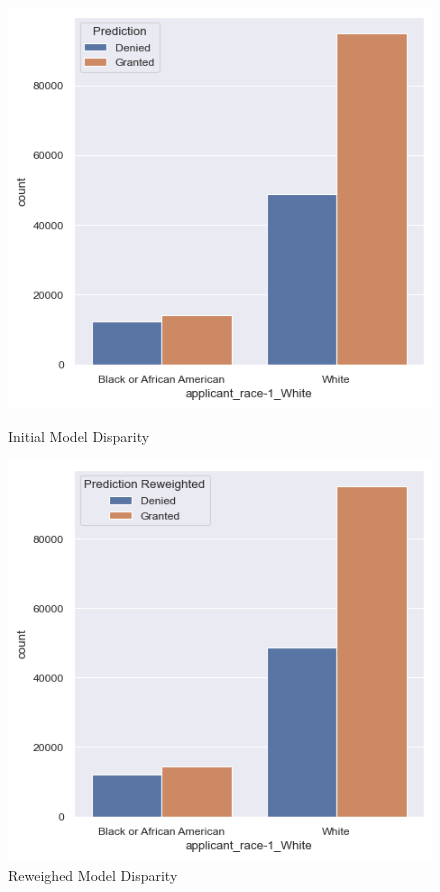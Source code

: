 \begin{figure}[h]
    \centering
    \begin{minipage}{0.5\textwidth}
        \centering
        \includegraphics[width=\textwidth]{images/loan_grants_by_protected_attributes/initial.png}
        \caption{Initial Model Disparity}
        \label{fig:Initial_Disparity}
    \end{minipage}\hfill
    \begin{minipage}{0.5\textwidth}
        \centering
        \includegraphics[width=\textwidth]{images/loan_grants_by_protected_attributes/reweighted.png}
        \caption{Reweighed Model Disparity}
        \label{fig:Reweighed_Disparity}
    \end{minipage}
    

\end{figure}
